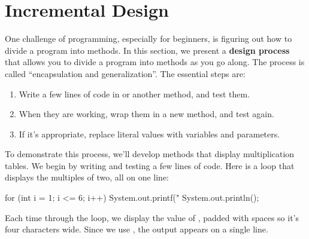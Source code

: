 \section{Incremental Design}
\label{encapsulation}




One challenge of programming, especially for beginners, is figuring out how to divide a program into methods.
In this section, we present a {\bf design process} that allows you to divide a program into methods as you go along.
The process is called ``encapsulation and generalization''.
The essential steps are:

\begin{enumerate}
\item Write a few lines of code in  or another method, and test them.
\item When they are working, wrap them in a new method, and test again.
\item If it's appropriate, replace literal values with variables and parameters.
\end{enumerate}


To demonstrate this process, we'll develop methods that display multiplication tables.
We begin by writing and testing a few lines of code.
Here is a loop that displays the multiples of two, all on one line:

\begin{code}
for (int i = 1; i <= 6; i++) {
    System.out.printf("%
}
System.out.println();
\end{code}

%

Each time through the loop, we display the value of , padded with spaces so it's four characters wide.
Since we use , the output appears on a single line.

